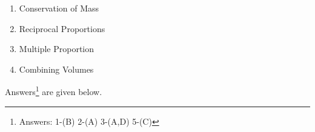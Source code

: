 \documentclass[
  14pt,
]{extarticle}
\providecommand{\tightlist}{%
  \setlength{\itemsep}{0pt}\setlength{\parskip}{0pt}}
\begin{document}
\begin{enumerate}
  \begin{enumerate}
  \def\labelenumii{(\Alph{enumii})}
  \tightlist
  \item
    Conservation of Mass
  \item
    Reciprocal Proportions
  \item
    Multiple Proportion
  \item
    Combining Volumes
  \end{enumerate}
\end{enumerate}

Answers\footnote{Answers: 1-(B) 2-(A) 3-(A,D) 5-(C)} are given below.
\end{document}
